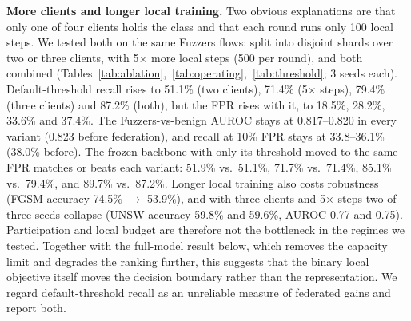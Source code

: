 \documentclass[conference]{IEEEtran}
\begin{document}
\begin{table}[t]\centering
\caption{Federated Fuzzers recall vs.\ the frozen backbone with only its decision threshold moved to the same benign FPR (official UNSW-NB15 test set; EC2). The frozen model needs no federation at all.}
\label{tab:threshold}
\end{table}

\textbf{More clients and longer local training.} Two obvious explanations
are that only one of four clients holds the class and that each round runs
only 100 local steps. We tested both on the same Fuzzers flows: split into
disjoint shards over two or three clients, with 5$\times$ more local steps
(500 per round), and both combined (Tables~\ref{tab:ablation},~\ref{tab:operating},~\ref{tab:threshold};
3 seeds each). Default-threshold recall rises to 51.1\% (two clients),
71.4\% (5$\times$ steps), 79.4\% (three clients) and 87.2\% (both), but the
FPR rises with it, to 18.5\%, 28.2\%, 33.6\% and 37.4\%. The Fuzzers-vs-benign
AUROC stays at 0.817--0.820 in every variant (0.823 before federation), and
recall at 10\% FPR stays at 33.8--36.1\% (38.0\% before). The frozen backbone
with only its threshold moved to the same FPR matches or beats each variant:
51.9\% vs.\ 51.1\%, 71.7\% vs.\ 71.4\%, 85.1\% vs.\ 79.4\%, and 89.7\% vs.\
87.2\%. Longer local training also costs robustness (FGSM accuracy 74.5\%
$\rightarrow$ 53.9\%), and with three clients and 5$\times$ steps two of three
seeds collapse (UNSW accuracy 59.8\% and 59.6\%, AUROC 0.77 and 0.75).
Participation and local budget are therefore not the bottleneck in the regimes
we tested. Together with the full-model result below, which removes the
capacity limit and degrades the ranking further, this suggests that the
binary local objective itself moves the decision boundary rather than the
representation. We regard default-threshold recall as an unreliable measure
of federated gains and report both.
\end{document}

